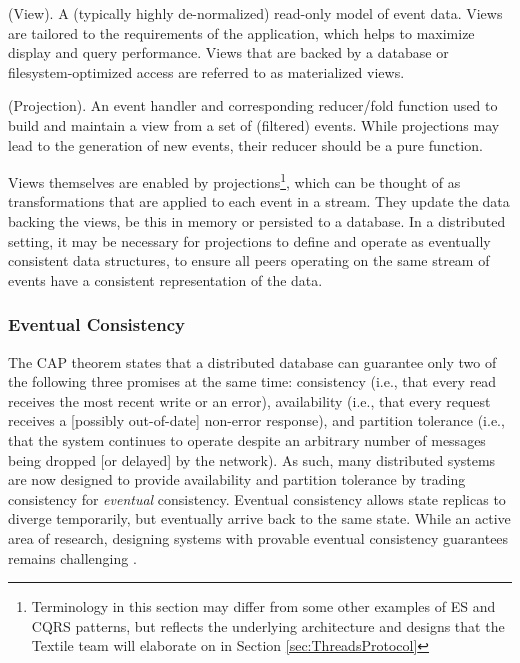 \documentclass{textile}
\begin{document}
\begin{definition}
  (View). A (typically highly de-normalized) read-only model of event data. Views are tailored to the requirements of the application, which helps to maximize display and query performance. Views that are backed by a database or filesystem-optimized access are referred to as materialized views.
\end{definition}

\begin{definition}
  (Projection). An event handler and corresponding reducer/fold function used to build and maintain a view from a set of (filtered) events. While projections may lead to the generation of new events, their reducer should be a pure function.
\end{definition}

Views themselves are enabled by projections\footnote{Terminology in this section may differ from some other examples of ES and CQRS patterns, but reflects the underlying architecture and designs that the Textile team will elaborate on in Section \ref{sec:ThreadsProtocol}}, which can be thought of as transformations that are applied to each event in a stream. They update the data backing the views, be this in memory or persisted to a database. In a distributed setting, it may be necessary for projections to define and operate as eventually consistent data structures, to ensure all peers operating on the same stream of events have a consistent representation of the data.

\subsubsection{Eventual Consistency} \label{sec:EventualConsistency}

The CAP theorem \cite{brewerRobustDistributedSystems2000,gilbertBrewerConjectureFeasibility2002a} states that a distributed database can guarantee only two of the following three promises at the same time: consistency (i.e., that every read receives the most recent write or an error), availability (i.e., that every request receives a [possibly out-of-date] non-error response), and partition tolerance (i.e., that the system continues to operate despite an arbitrary number of messages being dropped [or delayed] by the network). As such, many distributed systems are now designed to provide availability and partition tolerance by trading consistency for \emph{eventual} consistency. Eventual consistency allows state replicas to diverge temporarily, but eventually arrive back to the same state. While an active area of research, designing systems with provable eventual consistency guarantees remains challenging \cite{shapiroComprehensiveStudyConvergent2011a,almeidaDeltaStateReplicated2018}.
\end{document}
